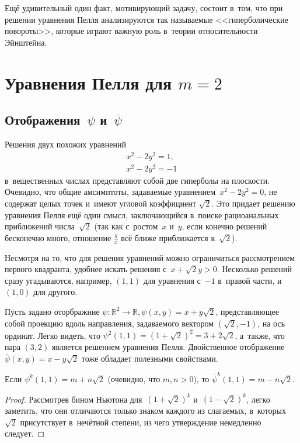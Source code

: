 \documentclass{article}
\begin{document}
Ещё удивительный один факт, мотивирующий задачу, состоит в~том, что при решении
уравнения Пелля анализируются так называемые <<гиперболические повороты>>,
которые играют важную роль в~теории относительности Эйнштейна.

\section{Уравнения Пелля для $m = 2$}

\subsection{Отображения~$\psi$ и~$\overline\psi$}

Решения двух похожих уравнений
\begin{gather}
  \label{pell} x^2 - 2y^2 = 1,\\
  \label{antipell} x^2 - 2y^2 = -1
\end{gather}
в~вещественных числах представляют собой две гиперболы на плоскости. Очевидно,
что общие амсимптоты, задаваемые уравнением~$x^2 - 2y^2 = 0$, не содержат целых
точек и~имеют угловой коэффициент $\sqrt{2}$. Это придает решению уравнения
Пелля ещё один смысл, заключающийся в~поиске рациоанальных приближений
числа~$\sqrt{2}$ (так как с~ростом~$x$ и~$y$, если конечно решений бесконечно
много, отношение $\frac{y}{x}$ всё ближе приближается к~$\sqrt{2}$).

Несмотря на то, что для решения уравнений можно ограничиться рассмотрением
первого квадранта, удобнее искать решения с~$x + \sqrt{2} y > 0$.
Несколько решений сразу угадываются, например, $(1, 1)$ для уравнения с~$-1$
в~правой части, и~$(1, 0)$ для другого.

Пусть задано оторбражние $\psi \colon \mathbb{R}^2 \rightarrow \mathbb{R},
\psi(x, y) = x + y \sqrt{2}$, представляющее собой проекцию вдоль направления,
задаваемого вектором $(\sqrt{2}, -1)$, на ось ординат. Легко видеть, что
$\psi^2(1, 1) = (1 + \sqrt{2})^2 = 3 + 2\sqrt{2}$, а~также, что пара $(3, 2)$
является решением уравнения Пелля. Двойственное
отображение~$\overline{\psi}(x, y) = x - y \sqrt{2}$ тоже обладает полезными
свойствами.

\begin{claim}
  Если $\psi^k(1, 1) = m + n \sqrt{2}$ (очевидно, что $m, n > 0$), то
  $\overline{\psi}^k(1, 1) = m - n \sqrt{2}$.
\end{claim}
\begin{proof}
  Рассмотрев бином Ньютона для~$(1 + \sqrt{2})^k$ и~$(1 - \sqrt{2})^k$, легко
  заметить, что они отличаются только знаком каждого из слагаемых, в~которых
  $\sqrt{2}$ присутствует в~нечётной степени, из чего утверждение немедленно
  следует.
\end{proof}
\end{document}

